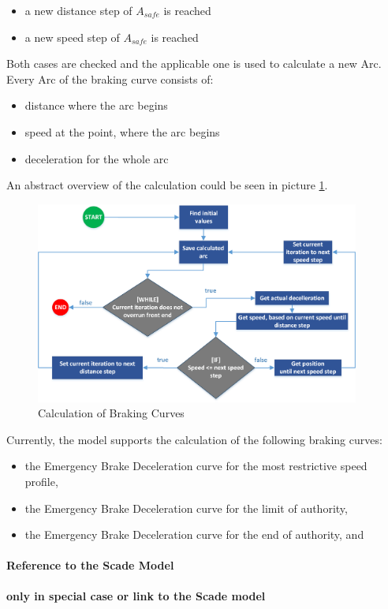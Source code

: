 \begin{itemize}
\item a new distance step of $A_{safe}$ is reached
\item a new speed step of $A_{safe}$ is reached
\end{itemize}

Both cases are checked and the applicable one is used to calculate a new Arc. Every Arc of the braking curve consists of:
\begin{itemize}
\item distance where the arc begins
\item speed at the point, where the arc begins
\item deceleration for the whole arc
\end{itemize}
An abstract overview of the calculation could be seen in picture \ref{fig:bc_calc}.
\begin{figure}[!h]
\centering
\includegraphics[width=0.95\textwidth]{../images/EBD_CalcAlgorithm.png}
\caption{Calculation of Braking Curves}\label{fig:bc_calc}
\end{figure}

Currently, the model supports the calculation of the following braking curves:
\begin{itemize}
	\item the Emergency Brake Deceleration curve for the most restrictive speed profile,
	\item the Emergency Brake Deceleration curve for the limit of authority,
	\item the Emergency Brake Deceleration curve for the end of authority, and
\end{itemize}
\paragraph{Reference to the Scade Model}
\textbf{only in special case or link to the Scade model}


